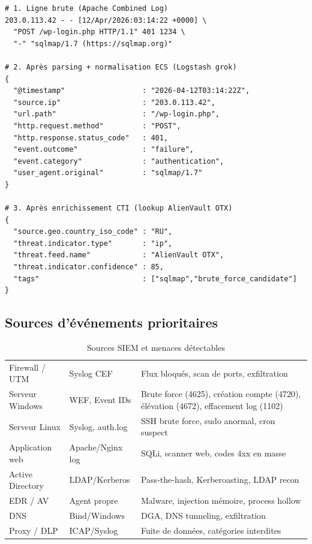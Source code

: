 \begin{lstlisting}[style=StyleTerminal,
  caption={Log brut Apache $\to$ événement normalisé ECS $\to$ enrichi CTI},
  label={lst:siem-pipeline}]
# 1. Ligne brute (Apache Combined Log)
203.0.113.42 - - [12/Apr/2026:03:14:22 +0000] \
  "POST /wp-login.php HTTP/1.1" 401 1234 \
  "-" "sqlmap/1.7 (https://sqlmap.org)"

# 2. Après parsing + normalisation ECS (Logstash grok)
{
  "@timestamp"                  : "2026-04-12T03:14:22Z",
  "source.ip"                   : "203.0.113.42",
  "url.path"                    : "/wp-login.php",
  "http.request.method"         : "POST",
  "http.response.status_code"   : 401,
  "event.outcome"               : "failure",
  "event.category"              : "authentication",
  "user_agent.original"         : "sqlmap/1.7"
}

# 3. Après enrichissement CTI (lookup AlienVault OTX)
{
  "source.geo.country_iso_code" : "RU",
  "threat.indicator.type"       : "ip",
  "threat.feed.name"            : "AlienVault OTX",
  "threat.indicator.confidence" : 85,
  "tags"                        : ["sqlmap","brute_force_candidate"]
}
\end{lstlisting}

\subsection{Sources d'événements prioritaires}

\begin{table}[H]
\centering\small
\caption{Sources SIEM et menaces détectables}
\label{tab:sources-siem}
\rowcolors{2}{TableauPair}{TableauImpair}
\begin{tabular}{p{3cm}p{3.2cm}p{7.3cm}}
\toprule
\tableauHeader{Source} & \tableauHeader{Format} &
\tableauHeader{Menaces détectables} \\
\midrule
Firewall / UTM    & Syslog CEF     & Flux bloqués, scan de ports, exfiltration \\
Serveur Windows   & WEF, Event IDs & Brute force (4625), création compte (4720),
                                     élévation (4672), effacement log (1102) \\
Serveur Linux     & Syslog, auth.log & SSH brute force, sudo anormal, cron suspect \\
Application web   & Apache/Nginx log & SQLi, scanner web, codes 4xx en masse \\
Active Directory  & LDAP/Kerberos  & Pass-the-hash, Kerberoasting, LDAP recon \\
EDR / AV          & Agent propre   & Malware, injection mémoire, process hollow \\
DNS               & Bind/Windows   & DGA, DNS tunneling, exfiltration \\
Proxy / DLP       & ICAP/Syslog    & Fuite de données, catégories interdites \\
\bottomrule
\end{tabular}
\end{table}

